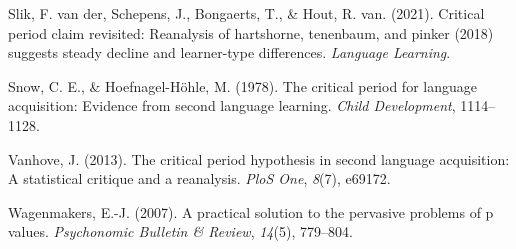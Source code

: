 \documentclass[
  english,
  doc,floatsintext]{apa6}
\newlength{\cslhangindent}
\newlength{\cslentryspacingunit} %
\newenvironment{CSLReferences}[2] %
 {%
  \setlength{\parindent}{0pt}
  \ifodd #1
  \let\oldpar\par
  \def\par{\hangindent=\cslhangindent\oldpar}
  \fi
  \setlength{\parskip}{#2\cslentryspacingunit}
 }%
 {}
\begin{document}
\begin{CSLReferences}{1}{0}
\leavevmode{}%
Slik, F. van der, Schepens, J., Bongaerts, T., \& Hout, R. van. (2021). Critical period claim revisited: Reanalysis of hartshorne, tenenbaum, and pinker (2018) suggests steady decline and learner-type differences. \emph{Language Learning}.

\leavevmode{}%
Snow, C. E., \& Hoefnagel-Höhle, M. (1978). The critical period for language acquisition: Evidence from second language learning. \emph{Child Development}, 1114--1128.

\leavevmode{}%
Vanhove, J. (2013). The critical period hypothesis in second language acquisition: A statistical critique and a reanalysis. \emph{PloS One}, \emph{8}(7), e69172.

\leavevmode{}%
Wagenmakers, E.-J. (2007). A practical solution to the pervasive problems of p values. \emph{Psychonomic Bulletin \& Review}, \emph{14}(5), 779--804.

\end{CSLReferences}


\clearpage
\end{document}
